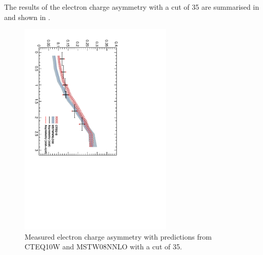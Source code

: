 The results of the electron charge asymmetry with a \pT cut of \unit{35}{\GeV}
are summarised in  and shown in
.

\begin{figure}[htbp]
  \begin{center}
\includegraphics*[width=0.65\textwidth,angle=90]{Asym_35}
  \caption{\label{fig:asym35} Measured electron charge asymmetry with predictions from CTEQ10W and MSTW08NNLO with a \pT cut of \unit{35}{\GeV}.}
  \end{center}
\end{figure}

